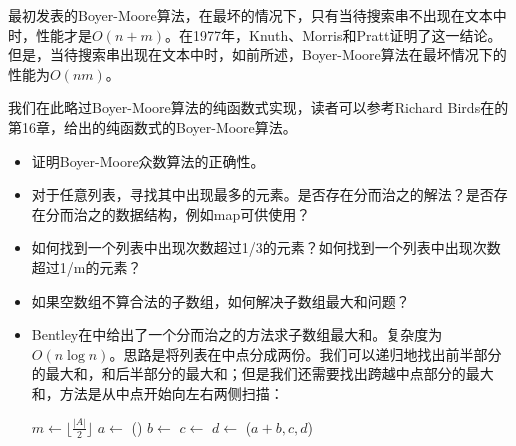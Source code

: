 \documentclass[UTF8]{article}
\begin{document}
最初发表的Boyer-Moore算法，在最坏的情况下，只有当待搜索串不出现在文本中时，性能才是$O(n+m)$\cite{boyer-moore}。在1977年，Knuth、Morris和Pratt证明了这一结论。但是，当待搜索串出现在文本中时，如前所述，Boyer-Moore算法在最坏情况下的性能为$O(nm)$。

我们在此略过Boyer-Moore算法的纯函数式实现，读者可以参考Richard Birds在\cite{fp-pearls}的第16章，给出的纯函数式的Boyer-Moore算法。

\begin{Exercise}
\begin{itemize}
\item 证明Boyer-Moore众数算法的正确性。
\item 对于任意列表，寻找其中出现最多的元素。是否存在分而治之的解法？是否存在分而治之的数据结构，例如map可供使用？
\item 如何找到一个列表中出现次数超过1/3的元素？如何找到一个列表中出现次数超过1/m的元素？
\item 如果空数组不算合法的子数组，如何解决子数组最大和问题？
\item Bentley在\cite{programming-pearls}中给出了一个分而治之的方法求子数组最大和。复杂度为$O(n \log n)$。思路是将列表在中点分成两份。我们可以递归地找出前半部分的最大和，和后半部分的最大和；但是我们还需要找出跨越中点部分的最大和，方法是从中点开始向左右两侧扫描：
\begin{algorithmic}[1]
    \State {}
    \State \Return {}
  \Else
    \State $m \gets \lfloor \frac{|A|}{2} \rfloor$
    \State $a \gets$ ()
    \State $b \gets$ 
    \State $c \gets$ 
    \State $d \gets$ \Call{Max-Sum}{$A[m+1...|A|$}
    \State \Return {}($a+b, c, d$)
  \EndIf
\EndFunction
\Statex

\end{algorithmic}
\end{itemize}
\end{Exercise}
\end{document}
